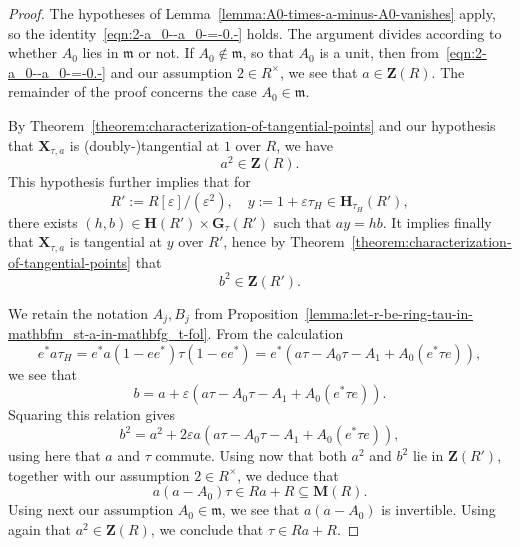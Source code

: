 \documentclass[reqno]{amsart}
\def\eps{\varepsilon}
\theoremstyle{plain} \newtheorem{theorem} {Theorem} \newtheorem{conjecture} {Conjecture} \newtheorem{corollary} [theorem] {Corollary} \newtheorem{proposition} [theorem] {Proposition} \newtheorem{fact} [theorem] {Fact}
\theoremstyle{definition} \newtheorem{definition} [theorem] {Definition}
\theoremstyle{itplain} %
\begin{document}
\begin{proof}
  The hypotheses of Lemma~\ref{lemma:A0-times-a-minus-A0-vanishes} apply, so the identity~\eqref{eqn:2-a_0--a_0-=-0.-} holds.  The argument divides according to whether $A_0$ lies in $\mathfrak{m}$ or not. If $A_0 \notin \mathfrak{m}$, so that $A_0$ is a unit, then from~\eqref{eqn:2-a_0--a_0-=-0.-} and our assumption $2 \in R^\times$, we see that $a \in \mathbf{Z}(R)$.  The remainder of the proof concerns the case $A_0 \in \mathfrak{m}$.

  By Theorem~\ref{theorem:characterization-of-tangential-points} and our hypothesis that $\mathbf{X}_{\tau,a}$ is (doubly-)tangential at $1$ over $R$, we have
  \begin{equation*}
    a^2 \in \mathbf{Z}(R).
  \end{equation*}
  This hypothesis further implies that for
  \begin{equation*}
    R' := R[\eps] / (\eps^2), \quad
    y := 1 + \eps \tau _H \in \mathbf{H}_{\tau_H}(R'),
  \end{equation*}
  there exists $(h,b) \in \mathbf{H}(R') \times \mathbf{G}_\tau(R')$ such that $a y = h b$.  It implies finally that $\mathbf{X}_{\tau,a}$ is tangential at $y$ over $R'$, hence by Theorem~\ref{theorem:characterization-of-tangential-points} that
  \begin{equation*}
 b^2 \in \mathbf{Z}(R').
\end{equation*}


  We retain the notation $A_j, B_j$ from Proposition~\ref{lemma:let-r-be-ring-tau-in-mathbfm_st-a-in-mathbfg_t-fol}.  From the calculation
  \begin{equation*}
    e^* a \tau_H = e^* a (1 - e e^*) \tau ( 1-  e e^*)
    =  e^* \left( a \tau - A_0 \tau - A_1 + A_0 (e^* \tau e) \right),
  \end{equation*}
  we see that
  \begin{equation*}
    b = a + \eps \left(a \tau - A _0 \tau - A _1 + A _0 (e^* \tau e)\right).
  \end{equation*}
  Squaring this relation gives
  \begin{equation}\label{eqn:b2-=-a2-+-2-eps-lefta-tau-_0-tau-_1-+-_0-e-tau}
    b^2 = a^2 + 2 \eps a \left(a \tau - A _0 \tau - A _1 + A _0 (e^* \tau e)\right),
  \end{equation}
  using here that $a$ and $\tau$ commute.  Using now that both $a^2 $ and $b^2$ lie in $\mathbf{Z}(R')$, together with our assumption $2 \in R^\times$,  we deduce that
  \begin{equation*}
    a (a - A_0) \tau \in R a + R \subseteq \mathbf{M}(R).
  \end{equation*}
  Using next our assumption $A_0 \in \mathfrak{m}$, we see that $a(a-A_0)$ is invertible.  Using again that $a^2 \in \mathbf{Z}(R)$, we conclude that $\tau \in R a + R$.
\end{proof}
\end{document}

